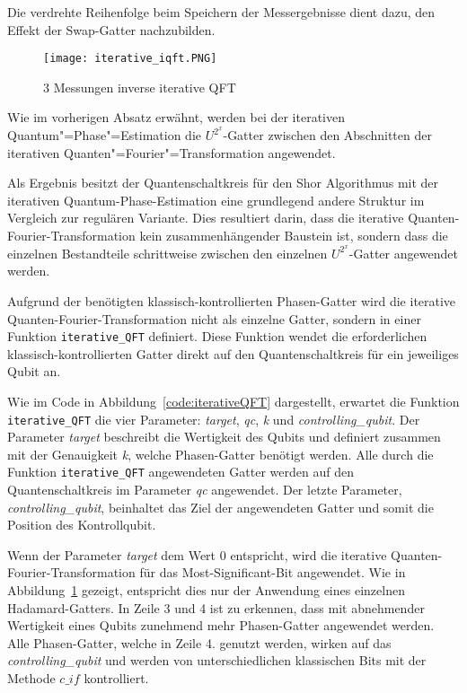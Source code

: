 Die verdrehte Reihenfolge beim Speichern der Messergebnisse dient dazu, 
den Effekt der Swap-Gatter nachzubilden.
\begin{figure}[H]
  \centering
  \texttt{[image: iterative\_iqft.PNG]}
  \caption{3 Messungen inverse iterative QFT}
  \label{fig:iterative_iQFT}
\end{figure}
  
Wie im vorherigen Absatz erwähnt, 
werden bei der iterativen Quantum"=Phase"=Estimation die \(U^{2^x}\)-Gatter zwischen den Abschnitten 
der iterativen Quanten"=Fourier"=Transformation angewendet. 

Als Ergebnis besitzt der Quantenschaltkreis für den Shor Algorithmus mit der iterativen Quantum-Phase-Estimation eine grundlegend andere Struktur 
im Vergleich zur regulären Variante.
Dies resultiert darin, dass die iterative Quanten-Fourier-Transformation kein zusammenhängender Baustein ist, 
sondern dass die einzelnen Bestandteile schrittweise zwischen 
den einzelnen \(U^{2^x}\)-Gatter angewendet werden.

\bigskip

Aufgrund der benötigten klassisch-kontrollierten Phasen-Gatter wird die iterative Quanten-Fourier-Transformation nicht als einzelne Gatter, 
sondern in einer Funktion \texttt{iterative\_QFT} definiert.
Diese Funktion wendet die erforderlichen klassisch-kontrollierten Gatter direkt auf den Quantenschaltkreis für ein jeweiliges Qubit an.

Wie im Code in Abbildung~\ref{code:iterativeQFT} dargestellt, 
erwartet die Funktion \texttt{iterative\_QFT} die vier Parameter: \textit{target}, \textit{qc}, \textit{k} und \textit{controlling\_qubit}.
Der Parameter \textit{target} beschreibt die Wertigkeit des Qubits und 
definiert zusammen mit der Genauigkeit \textit{k}, 
welche Phasen-Gatter benötigt werden.
Alle durch die Funktion \texttt{iterative\_QFT} angewendeten Gatter 
werden auf den Quantenschaltkreis im Parameter \textit{qc} angewendet.
Der letzte Parameter, \textit{controlling\_qubit}, beinhaltet das Ziel der angewendeten Gatter und 
somit die Position des Kontrollqubit.

Wenn der Parameter \textit{target} dem Wert 0 entspricht, 
wird die iterative Quanten-Fourier-Transformation für das Most-Significant-Bit angewendet.
Wie in Abbildung~\ref{fig:iterative_iQFT} gezeigt, entspricht dies nur der Anwendung eines einzelnen Hadamard-Gatters.
In Zeile 3 und 4 ist zu erkennen, 
dass mit abnehmender Wertigkeit eines Qubits zunehmend mehr Phasen-Gatter angewendet werden.
Alle Phasen-Gatter, welche in Zeile 4. genutzt werden, 
wirken auf das \textit{controlling\_qubit} und 
werden von unterschiedlichen klassischen Bits mit der Methode \(c\_if\) kontrolliert.

